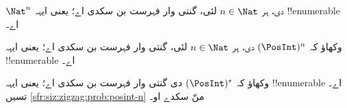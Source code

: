 \documentclass[../../../include/open-logic-section]{subfiles}
\begin{document}
\begin{prop}
$\Nat^n$ دی، ہر $n \in \Nat$ لئی، گنتی وار فہرست بن سکدی اے؛ یعنی
ایہہ !!{enumerable} اے۔
\end{prop}

\begin{prob}\label{sfr:siz:zigzag:prob:posint-n}
وکھاؤ کہ $(\PosInt)^n$ دی، ہر $n \in \Nat$ لئی، گنتی وار فہرست بن
سکدی اے؛ یعنی ایہہ !!{enumerable} اے۔
\end{prob}

\begin{prob}\label{sfr:siz:zigzag:prob:posint-star}
  وکھاؤ کہ $(\PosInt)^*$ دی گنتی وار فہرست بن سکدی اے؛ یعنی ایہہ
  !!{enumerable} اے۔ تسیں \cref{sfr:siz:zigzag:prob:posint-n}
  منّ سکدے او۔
\end{prob}
\end{document}

